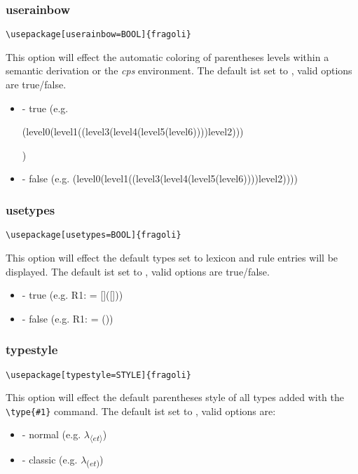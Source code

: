 \documentclass[10pt, a4paper]{article}
\newenvironment{itemizeexample}{
	\begin{itemize}
		\setlength\itemsep{-.5em}
	}
	{
	\end{itemize}
}
\begin{document}
	\subsubsection{userainbow}
	\begin{lstlisting}[style=A]
	\usepackage[userainbow=BOOL]{fragoli}
	\end{lstlisting}
	This option will effect the automatic coloring of parentheses levels within a semantic derivation or the \textit{cps} environment. The default ist set to \texttt{}, valid options are true/false.
	\begin{itemizeexample}
		\item[-] true (e.g. \begin{cps}(level0(level1((level3(level4(level5(level6))))level2)))\end{cps})
		\item[-] false (e.g. (level0(level1((level3(level4(level5(level6))))level2))))
	\end{itemizeexample}
	\subsubsection{usetypes}
	\begin{lstlisting}[style=A]
	\usepackage[usetypes=BOOL]{fragoli}
	\end{lstlisting}
	This option will effect the default types set to lexicon and rule entries will be displayed. The default ist set to \texttt{}, valid options are true/false.
	\begin{itemizeexample}
		\item[-] true (e.g. R1:  = []([]\lambheN[x][\type{e}]))
		\item[-] false (e.g. R1:  = (\lambheN{}))
	\end{itemizeexample}
	\subsubsection{typestyle}
	\begin{lstlisting}[style=A]
	\usepackage[typestyle=STYLE]{fragoli}
	\end{lstlisting}
	This option will effect the default parentheses style of all types added with the \verb=\type{#1}= command. The default ist set to \texttt{}, valid options are:
	\begin{itemizeexample}
		\item[-] normal (e.g. $\lambda$\textsubscript{$\langle$$et$$\rangle$})
		\item[-] classic (e.g. $\lambda$\textsubscript{($et$)})
	\end{itemizeexample}
\end{document}
